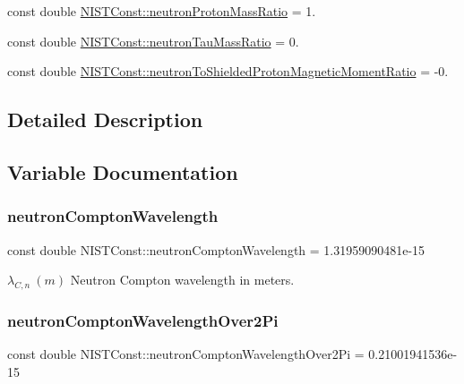\begin{DoxyCompactItemize}
\item 
const double \mbox{\hyperlink{group___n_i_s_t_const-_neutron_gad8a08222b3de2105b5b399faa5a59fbd}{N\+I\+S\+T\+Const\+::neutron\+Proton\+Mass\+Ratio}} = 1.
\item 
const double \mbox{\hyperlink{group___n_i_s_t_const-_neutron_ga9c3ba7b26cbcc0b2f7f7fa551812683a}{N\+I\+S\+T\+Const\+::neutron\+Tau\+Mass\+Ratio}} = 0.
\item 
const double \mbox{\hyperlink{group___n_i_s_t_const-_neutron_ga7446ad6eb4c1e0b8167d1a1ff5c4cd89}{N\+I\+S\+T\+Const\+::neutron\+To\+Shielded\+Proton\+Magnetic\+Moment\+Ratio}} = -\/0.
\end{DoxyCompactItemize}


\subsection{Detailed Description}


\subsection{Variable Documentation}
\mbox{\label{group___n_i_s_t_const-_neutron_ga769ac3bb36b199f820b5d2974d63f897}} 
\subsubsection{\texorpdfstring{neutron\+Compton\+Wavelength}{neutronComptonWavelength}}
{\footnotesize\ttfamily const double N\+I\+S\+T\+Const\+::neutron\+Compton\+Wavelength = 1.\+31959090481e-\/15}

$\lambda_{C,n} \ (m)$ Neutron Compton wavelength in meters. \mbox{\label{group___n_i_s_t_const-_neutron_ga296bbfcb4bd095c1167efa636898632c}} 
\subsubsection{\texorpdfstring{neutron\+Compton\+Wavelength\+Over2\+Pi}{neutronComptonWavelengthOver2Pi}}
{\footnotesize\ttfamily const double N\+I\+S\+T\+Const\+::neutron\+Compton\+Wavelength\+Over2\+Pi = 0.\+21001941536e-\/15}

